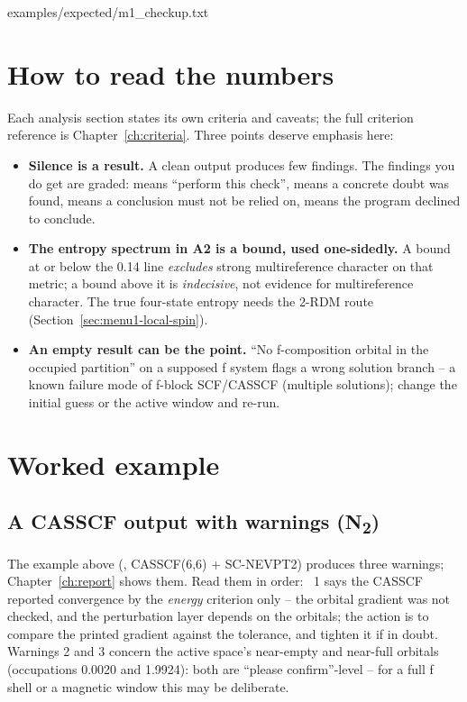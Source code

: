 
  {examples/expected/m1_checkup.txt}

\section{How to read the numbers}

Each analysis section states its own criteria and caveats; the full criterion
reference is Chapter~\ref{ch:criteria}. Three points deserve emphasis here:

\begin{readbox}
\begin{itemize}
  \item \textbf{Silence is a result.} A clean output produces few findings. The
    findings you do get are graded:  means ``perform this check'',
     means a concrete doubt was found,  means a conclusion
    must not be relied on,  means the program declined to conclude.
  \item \textbf{The entropy spectrum in A2 is a bound, used one-sidedly.} A
    bound at or below the 0.14 line \emph{excludes} strong multireference
    character on that metric; a bound above it is \emph{indecisive}, not
    evidence for multireference character. The true four-state entropy needs the
    2-RDM route (Section~\ref{sec:menu1-local-spin}).
  \item \textbf{An empty result can be the point.} ``No f-composition orbital
    in the occupied partition'' on a supposed f system flags a wrong solution
    branch -- a known failure mode of f-block SCF/CASSCF (multiple solutions);
    change the initial guess or the active window and re-run.
\end{itemize}
\end{readbox}

\section{Worked example}

\subsection{A CASSCF output with warnings (N\textsubscript{2})}

The example above (, CASSCF(6,6) + SC-NEVPT2)
produces three warnings; Chapter~\ref{ch:report} shows them. Read them in
order: ~1 says the CASSCF reported convergence by the \emph{energy}
criterion only -- the orbital gradient was not checked, and the perturbation
layer depends on the orbitals; the action is to compare the printed gradient
against the tolerance, and tighten it if in doubt. Warnings 2 and 3 concern the
active space's near-empty and near-full orbitals (occupations 0.0020 and
1.9924): both are ``please confirm''-level -- for a full f shell or a magnetic
window this may be deliberate.

